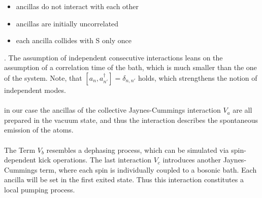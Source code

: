 \documentclass{article}
\begin{document}
\begin{itemize}
    \item ancillas do not interact with each other 
    \item ancillas are initially uncorrelated 
    \item each ancilla collides with S only once 
\end{itemize}. 
The assumption of independent consecutive interactions leans on the assumption of a correlation time of the bath, which is much smaller than the one of the system. Note, that $[a_n,a^\dagger_{n'}]=\delta_{n,n'}$ holds, which strengthens the notion of independent modes.\\\\%
in our case the ancillas of the collective Jaynes-Cummings interaction $V_a$ are all prepared in the vacuum state, and thus the interaction describes the spontaneous emission of the atoms.\\\\
The Term $V_b$ resembles a dephasing process, which can be simulated via spin-dependent kick operations\cite{exp_spin_boson}. The last interaction $V_c$ introduces another Jaynes-Cummings term, where each spin is individually coupled to a bosonic bath. Each ancilla will be set in the first exited state. Thus this interaction constitutes a local pumping process.
\end{document}
